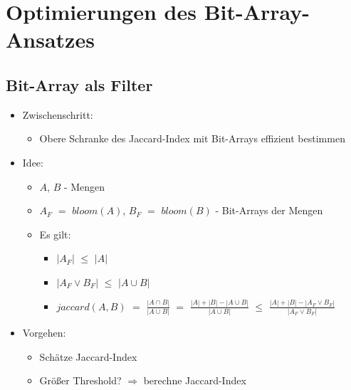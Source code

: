 \section{Optimierungen des Bit-Array-Ansatzes}

\subsection{Bit-Array als Filter}

\begin{frame}

	\begin{itemize}
		\setlength\itemsep{\stdItemSep}
		\item \alert<1->{Zwischenschritt:}
		\begin{itemize}
			\setlength\itemsep{\stdItemSep}
			\vspace*{\stdItemSep}
			\item \alert<1->{Obere Schranke des Jaccard-Index mit Bit-Arrays effizient bestimmen}
		\end{itemize}
		\item \alert<2->{Idee:}
		\begin{itemize}
			\setlength\itemsep{\stdItemSep}
			\vspace*{\stdItemSep}
			\item \alert<2->{$A$, $B$ - Mengen}
			\item \alert<3->{$A_{F}$ $=$ $bloom(A)$, $B_{F}$ $=$ $bloom(B)$ - Bit-Arrays der Mengen}
			\item \alert<4->{Es gilt:}
			\begin{itemize}
				\setlength\itemsep{\stdItemSep}
				\vspace*{\stdItemSep}
				\item \alert<4->{$|A_{F}|$ $\leq$ $|A|$}
				\item \alert<5->{$|A_{F} \vee B_{F}|$ $\leq$ $|A \cup B|$}
				\item \alert<6->{$jaccard(A, B)$ $=$ $\frac{|A \cap B|}{|A \cup B|}$} \alert<7->{$=$ $\frac{|A| + |B| - |A \cup B|}{|A \cup B|}$}
					\alert<8->{$\leq$ $\frac{|A| + |B| - |A_{F} \vee B_{F}|}{|A_{F} \vee B_{F}|}$}
			\end{itemize}
		\end{itemize}
		\item \alert<9->{Vorgehen:}
		\begin{itemize}
			\setlength\itemsep{\stdItemSep}
			\vspace*{\stdItemSep}
			\item \alert<9->{Schätze Jaccard-Index}
			\item \alert<10->{Größer Threshold? $\Rightarrow$ berechne Jaccard-Index}
		\end{itemize}
	\end{itemize}


\end{frame}
